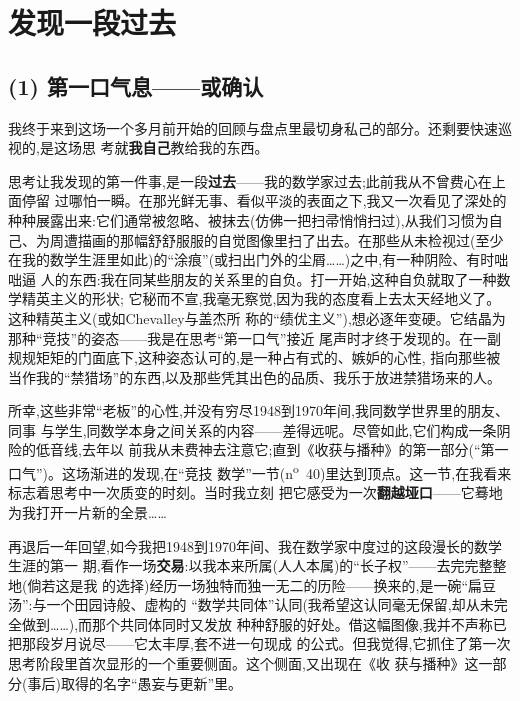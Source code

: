 \section{发现一段过去}

\subsection{(1) 第一口气息——或确认}   %


我终于来到这场一个多月前开始的回顾与盘点里最切身私己的部分。还剩要快速巡视的,是这场思
考就\textbf{我自己}教给我的东西。

思考让我发现的第一件事,是一段\textbf{过去}——我的数学家过去;此前我从不曾费心在上面停留
过哪怕一瞬。在那光鲜无事、看似平淡的表面之下,我又一次看见了深处的种种展露出来:它们通常被忽略、被抹去(仿佛一把扫帚悄悄扫过),从我们习惯为自己、为周遭描画的那幅舒舒服服的自觉图像里扫了出去。在那些从未检视过(至少在我的数学生涯里如此)的“涂痕”(或扫出门外的尘屑……)之中,有一种阴险、有时咄咄逼
人的东西:我在同某些朋友的关系里的自负。打一开始,这种自负就取了一种数学精英主义的形状;
它秘而不宣,我毫无察觉,因为我的态度看上去太天经地义了。这种精英主义(或如Chevalley与盖杰所
称的“绩优主义”),想必逐年变硬。它结晶为那种“竞技”的姿态——我是在思考“第一口气”接近
尾声时才终于发现的。在一副规规矩矩的门面底下,这种姿态认可的,是一种占有式的、嫉妒的心性,
指向那些被当作我的“禁猎场”的东西,以及那些凭其出色的品质、我乐于放进禁猎场来的人。

\pmark{}所幸,这些非常“老板”的心性,并没有穷尽1948到1970年间,我同数学世界里的朋友、同事
与学生,同数学本身之间关系的内容——差得远呢。尽管如此,它们构成一条阴险的低音线,去年以
前我从未费神去注意它;直到《收获与播种》的第一部分(“第一口气”)。这场渐进的发现,在“竞技
数学”一节(n\textsuperscript{o}~40)里达到顶点。这一节,在我看来标志着思考中一次质变的时刻。当时我立刻
把它感受为一次\textbf{翻越垭口}——它蓦地为我打开一片新的全景……

再退后一年回望,如今我把1948到1970年间、我在数学家中度过的这段漫长的数学生涯的第一
期,看作一场\textbf{交易}:以我本来所属(人人本属)的“长子权”——去完完整整地(倘若这是我
的选择)经历一场独特而独一无二的历险——换来的,是一碗“扁豆汤”:与一个田园诗般、虚构的
“数学共同体”认同(我希望这认同毫无保留,却从未完全做到……),而那个共同体同时又发放
种种舒服的好处。借这幅图像,我并不声称已把那段岁月说尽——它太丰厚,套不进一句现成
的公式。但我觉得,它抓住了第一次思考阶段里首次显形的一个重要侧面。这个侧面,又出现在《收
获与播种》这一部分(事后)取得的名字“愚妄与更新”里。

